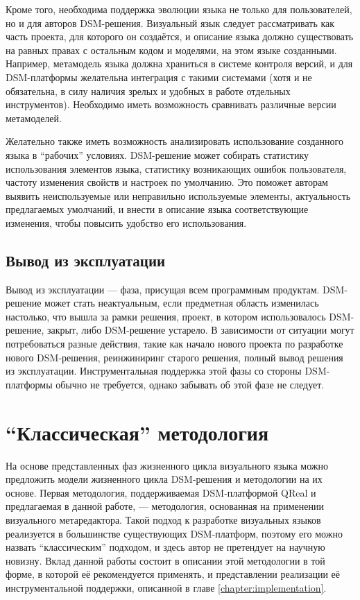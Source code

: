 Кроме того, необходима поддержка эволюции языка не только для пользователей, но и для 
авторов DSM-решения. Визуальный язык следует рассматривать как часть проекта, для которого 
он создаётся, и описание языка должно существовать на равных правах с остальным кодом 
и моделями, на этом языке созданными. Например, метамодель языка должна храниться в 
системе контроля версий, и для DSM-платформы желательна интеграция с такими системами 
(хотя и не обязательна, в силу наличия зрелых и удобных в работе отдельных инструментов). 
Необходимо иметь возможность сравнивать различные версии метамоделей.

Желательно также иметь возможность анализировать использование созданного языка в "`рабочих"' 
условиях. DSM-решение может собирать статистику использования элементов языка, статистику 
возникающих ошибок пользователя, частоту изменения свойств и настроек по умолчанию. 
Это поможет авторам выявить неиспользуемые или неправильно используемые элементы, 
актуальность предлагаемых умолчаний, и внести в описание языка соответствующие изменения, 
чтобы повысить удобство его использования.

\subsection{Вывод из эксплуатации}
Вывод из эксплуатации --- фаза, присущая всем программным продуктам. DSM-решение может 
стать неактуальным, если предметная область изменилась настолько, что вышла за рамки 
решения, проект, в котором использовалось DSM-решение, закрыт, либо DSM-решение устарело. 
В зависимости от ситуации могут потребоваться разные действия, такие как начало нового 
проекта по разработке нового DSM-решения, реинжиниринг старого решения, полный вывод 
решения из эксплуатации. Инструментальная поддержка этой фазы со стороны DSM-платформы 
обычно не требуется, однако забывать об этой фазе не следует.

\section{"`Классическая"' методология}
\label{chapter:classicMethodology}
На основе представленных фаз жизненного цикла визуального языка можно предложить модели 
жизненного цикла DSM-решения и методологии на их основе. Первая методология, поддерживаемая 
DSM-платформой QReal и предлагаемая в данной работе, --- методология, основанная на применении 
визуального метаредактора. Такой подход к разработке визуальных языков реализуется в 
большинстве существующих DSM-платформ, поэтому его можно назвать "`классическим"' подходом, 
и здесь автор не претендует на научную новизну. Вклад данной работы состоит в описании 
этой методологии в той форме, в которой её рекомендуется применять, и представлении 
реализации её инструментальной поддержки, описанной в главе \ref{chapter:implementation}. 

